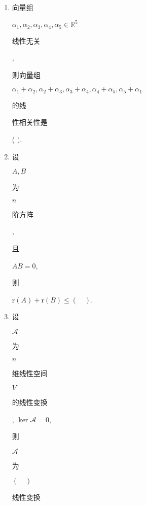 \documentclass[10pt]{article}
\begin{document}
\begin{enumerate}
  \item \begin{CJK}{UTF8}{mj}向量组\end{CJK} $\alpha_{1}, \alpha_{2}, \alpha_{3}, \alpha_{4}, \alpha_{5} \in \mathbb{R}^{5}$ \begin{CJK}{UTF8}{mj}线性无关\end{CJK}, \begin{CJK}{UTF8}{mj}则向量组\end{CJK} $\alpha_{1}+\alpha_{2}, \alpha_{2}+\alpha_{3}, \alpha_{3}+\alpha_{4}, \alpha_{4}+\alpha_{5}, \alpha_{5}+\alpha_{1}$ \begin{CJK}{UTF8}{mj}的线\end{CJK} \begin{CJK}{UTF8}{mj}性相关性是\end{CJK} ( $)$.

  \item \begin{CJK}{UTF8}{mj}设\end{CJK} $A, B$ \begin{CJK}{UTF8}{mj}为\end{CJK} $n$ \begin{CJK}{UTF8}{mj}阶方阵\end{CJK}, \begin{CJK}{UTF8}{mj}且\end{CJK} $A B=0$, \begin{CJK}{UTF8}{mj}则\end{CJK} $\mathrm{r}(A)+\mathrm{r}(B) \leq(\quad)$.

  \item \begin{CJK}{UTF8}{mj}设\end{CJK} $\mathscr{A}$ \begin{CJK}{UTF8}{mj}为\end{CJK} $n$ \begin{CJK}{UTF8}{mj}维线性空间\end{CJK} $V$ \begin{CJK}{UTF8}{mj}的线性变换\end{CJK}, $\operatorname{ker} \mathscr{A}=0$, \begin{CJK}{UTF8}{mj}则\end{CJK} $\mathscr{A}$ \begin{CJK}{UTF8}{mj}为\end{CJK} $(\quad)$ \begin{CJK}{UTF8}{mj}线性变换\end{CJK}


\end{enumerate}
\end{document}
